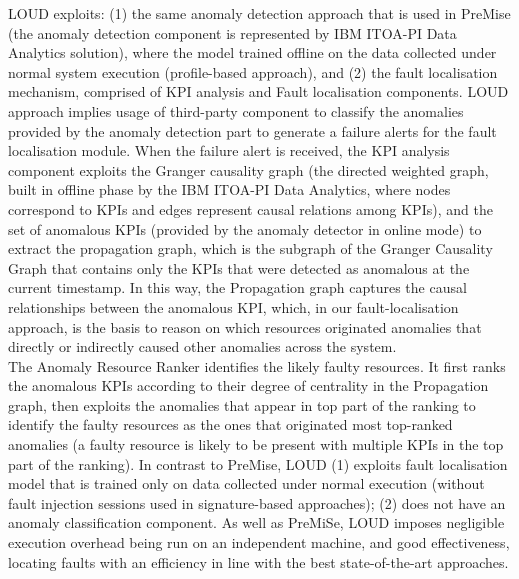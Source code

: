 \documentclass[]{usiinfprospectus}
\begin{document}
%
LOUD exploits: (1) the same anomaly detection approach that is used in PreMise (the anomaly detection component is represented by IBM ITOA-PI Data Analytics solution), where the model trained offline on the data collected under normal system execution (profile-based approach), and (2) the fault localisation mechanism, comprised of KPI analysis and Fault localisation components.
%
LOUD approach implies usage of third-party component to classify the anomalies provided by the anomaly detection part to generate a failure alerts for the fault localisation module.
%
When the failure alert is received, the KPI analysis component exploits the Granger causality graph (the directed weighted graph, built in offline phase by the IBM ITOA-PI Data Analytics, where nodes correspond to KPIs and edges represent causal relations among KPIs), and the set of anomalous KPIs (provided by the anomaly detector in online mode) to extract the propagation graph, which is the subgraph of the Granger Causality Graph that contains only the KPIs that were detected as anomalous at the current timestamp. In this way, the Propagation graph captures the causal relationships between the anomalous KPI, which, in our fault-localisation approach, is the basis to reason on which resources originated anomalies that directly or indirectly caused other anomalies across the system.\\
%
The Anomaly Resource Ranker identifies the likely faulty resources. It first ranks the anomalous KPIs according to their degree of centrality in the Propagation graph, then exploits the anomalies that appear in top part of the ranking to identify the faulty resources as the ones that originated most top-ranked anomalies (a faulty resource is likely to be present with multiple KPIs in the top part of the ranking).
%
%
In contrast to PreMise, LOUD (1) exploits fault localisation model that is trained only on data collected under normal execution (without fault injection sessions used in signature-based approaches); (2) does not have an anomaly classification component. As well as PreMiSe, LOUD imposes negligible execution overhead being run on an independent machine, and good effectiveness, locating faults with an efficiency in line with the best state-of-the-art approaches.\\\\
\end{document}
